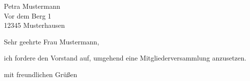 \documentclass{scrlttr2}
\begin{document}

\begin{letter}{Petra Mustermann\\
  Vor dem Berg 1\\
  12345 Musterhausen}

\opening{Sehr geehrte Frau Mustermann,}
ich fordere den Vorstand auf, umgehend
eine Mitgliederversammlung anzusetzen.
\closing{mit freundlichen Grüßen}

\end{letter}
\end{document}
